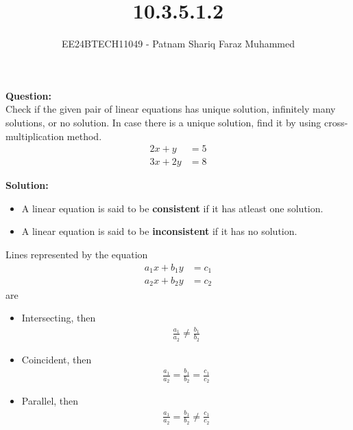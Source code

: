 \documentclass[journal]{IEEEtran}
\numberwithin{equation}{enumi}
\numberwithin{figure}{enumi}
\begin{document}


\title{10.3.5.1.2}
\author{EE24BTECH11049 - Patnam Shariq Faraz Muhammed}

{\let\newpage\relax\maketitle}

\textbf{Question:}\\
Check if the given pair of linear equations has unique solution, infinitely many solutions, or no solution. In case there is a unique solution, find it by using cross-multiplication method.
\begin{align}
    2x + y &= 5\\
    3x + 2y &= 8
\end{align}

\textbf{Solution: }\\

\begin{itemize}
    \item A linear equation is said to be \textbf{consistent} if it has atleast one solution.
    \item A linear equation is said to be \textbf{inconsistent} if it has no solution. 
\end{itemize}

Lines represented by the equation
\begin{align}
    a_1x+b_1y &= c_1\\
    a_2x+b_2y &= c_2
\end{align}
are 
\begin{itemize}
\item Intersecting, then
\begin{align}
   \frac{a_1}{a_2} \neq \frac{b_1}{b_2}
\end{align}

\item Coincident, then
\begin{align}
   \frac{a_1}{a_2} = \frac{b_1}{b_2} = \frac{c_1}{c_2}
\end{align}

\item Parallel, then
\begin{align}
   \frac{a_1}{a_2} = \frac{b_1}{b_2} \neq \frac{c_1}{c_2}
\end{align}
\end{itemize}
\end{document}

